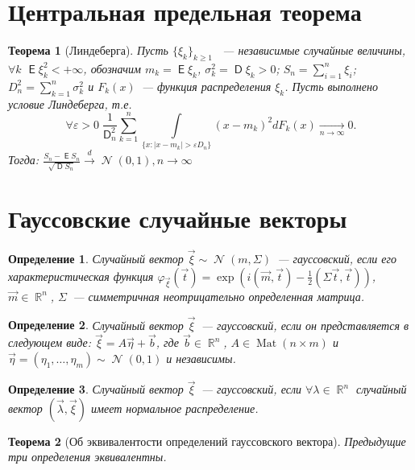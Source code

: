 \documentclass[11pt]{article}
\newtheorem{thm}{Теорема}[section]
\newtheorem{definition}{Определение}
\DeclareMathOperator{\E}{\mathsf{E}}
\DeclareMathOperator{\D}{\mathsf{D}}
\DeclareMathOperator{\N}{\mathcal{N}}
\DeclareMathOperator{\R}{\mathbb{R}}
\DeclareMathOperator{\Mat}{\text{Mat}}
\begin{document}
	\section{Центральная предельная теорема}
	\begin{thm}[Линдеберга]
		Пусть $\{\xi_k\}_{k \geq 1}$ ~--- независимые случайные величины,
		$\forall k$ $\E\xi_k^2 < +\infty$, обозначим $m_k = \E\xi_k$, $\sigma_k^2 = \D\xi_k > 0$; 
		$S_n = \sum\limits_{i=1}^n \xi_i$; $D_n^2 = \sum\limits_{k=1}^n \sigma_k^2$ и $F_k(x)$~--- 					функция распределения $\xi_k$. Пусть выполнено условие Линдеберга, т.е.
		\[
			\forall\varepsilon > 0\;\frac{1}{\D_n^2}\sum\limits_{k=1}^n\int\limits_{\{x : |x - m_k| > 					\varepsilon D_n\}}(x - m_k)^2 dF_k(x)\underset{n\rightarrow\infty}{\longrightarrow}0.			
		\]  
		Тогда: $\frac{S_n - \E S_n}{\sqrt{\D S_n}}\overset{d}{\rightarrow}\N(0,1), n\rightarrow \infty$	
	\end{thm}
	\section{Гауссовские случайные векторы}
	\begin{definition}
		Случайный вектор $\vec\xi\sim\N(m, \Sigma)$~--- гауссовский, если его характеристическая функция 
		$\varphi_{\vec\xi}(\vec t) = \exp \left(i(\vec m, \vec t) - \frac{1}{2}(\Sigma\vec t, \vec t)
		\right)$, $\vec m \in \R^n$, $\Sigma$~--- симметричная неотрицательно определенная матрица.
	\end{definition}	
	\begin{definition}
		Случайный вектор $\vec\xi$~--- гауссовский, если он представляется в следующем виде: 
		$\vec\xi = A\vec\eta + \vec b$, где $\vec b \in \R^n$, $A \in \Mat (n\times m)$ и $\vec\eta = 
		(\eta_1, \dots, \eta_m)\sim\N(0,1)$ и независимы.
	\end{definition}
	\begin{definition}
		Случайный вектор $\vec\xi$~--- гауссовский, если $\forall\lambda\in\R^n$ случайный вектор
		$(\vec\lambda,\vec\xi)$ имеет нормальное распределение.
	\end{definition}
	\begin{thm}[Об эквивалентости определений гауссовского вектора]
		Предыдущие три определения эквивалентны.
	\end{thm}
\end{document}
